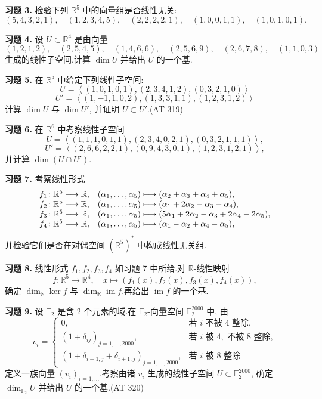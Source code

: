 \noindent\textbf{习题 3.} 检验下列 $\mathbb{R}^5$ 中的向量组是否线性无关:
\[
(5, 4, 3, 2, 1), \quad (1, 2, 3, 4, 5), \quad (2, 2, 2, 2, 1), \quad (1, 0, 0, 1, 1), \quad (1, 0, 1, 0, 1)\text{.}
\]

\noindent\textbf{习题 4.} 设 $U \subset \mathbb{R}^4$ 是由向量
\[
(1, 2, 1, 2), \quad (2, 5, 4, 5), \quad (1, 4, 6, 6), \quad (2, 5, 6, 9), \quad (2, 6, 7, 8), \quad (1, 1, 0, 3)
\]
生成的线性子空间.计算 $\dim U$ 并给出 $U$ 的一个基.

\noindent\textbf{习题 5.} 在 $\mathbb{R}^5$ 中给定下列线性子空间:
\[
U = \left\langle (1, 0, 1, 0, 1), (2, 3, 4, 1, 2), (0, 3, 2, 1, 0) \right\rangle
\]
\[
U' = \left\langle (1, -1, 1, 0, 2), (1, 3, 3, 1, 1), (1, 2, 3, 1, 2) \right\rangle
\]
计算 $\dim U$ 与 $\dim U'$, 并证明 $U \subset U'$.(AT 319)

\noindent\textbf{习题 6.} 在 $\mathbb{R}^6$ 中考察线性子空间
\[
U = \left\langle (1, 1, 1, 0, 1, 1), (2, 3, 4, 0, 2, 1), (0, 3, 2, 1, 1, 1) \right\rangle,
\]
\[
U' = \left\langle (2, 6, 6, 2, 2, 1), (0, 9, 4, 3, 0, 1), (1, 2, 3, 1, 2, 1) \right\rangle,
\]
并计算 $\dim(U \cap U')$.

\noindent\textbf{习题 7.} 考察线性形式
\[
\begin{array}{l l}
f_1 \colon \mathbb{R}^5 \longrightarrow \mathbb{R}, & (\alpha_1, \ldots, \alpha_5) \longmapsto (\alpha_2 + \alpha_3 + \alpha_4 + \alpha_5), \\
f_2 \colon \mathbb{R}^5 \longrightarrow \mathbb{R}, & (\alpha_1, \ldots, \alpha_5) \longmapsto (\alpha_1 + 2\alpha_2 - \alpha_3 - \alpha_4), \\
f_3 \colon \mathbb{R}^5 \longrightarrow \mathbb{R}, & (\alpha_1, \ldots, \alpha_5) \longmapsto (5\alpha_1 + 2\alpha_2 - \alpha_3 + 2\alpha_4 - 2\alpha_5), \\
f_4 \colon \mathbb{R}^5 \longrightarrow \mathbb{R}, & (\alpha_1, \ldots, \alpha_5) \longmapsto (\alpha_1 - \alpha_2 + \alpha_4 - \alpha_5),
\end{array}
\]
并检验它们是否在对偶空间 $(\mathbb{R}^5)^*$ 中构成线性无关组.

\noindent\textbf{习题 8.} 线性形式 $f_1, f_2, f_3, f_4$ 如习题 7 中所给.对 $\mathbb{R}$-线性映射
\[
f \colon \mathbb{R}^5 \longrightarrow \mathbb{R}^4, \quad x \longmapsto \left(f_1(x), f_2(x), f_3(x), f_4(x)\right),
\]
确定 $\dim_\mathbb{R} \ker f$ 与 $\dim_\mathbb{R} \operatorname{im} f$.再给出 $\operatorname{im} f$ 的一个基.

\noindent\textbf{习题 9.} 设 $\mathbb{F}_2$ 是含 2 个元素的域.在 $\mathbb{F}_2$-向量空间 $\mathbb{F}_2^{2000}$ 中, 由
\[
v_i = \begin{cases}
0, & \text{若 } i \text{ 不被 } 4 \text{ 整除}, \\
(1 + \delta_{ij})_{j = 1, \ldots, 2000}, & \text{若 } i \text{ 被 } 4, \text{ 不被 } 8 \text{ 整除}, \\
(1 + \delta_{i - 1, j} + \delta_{i + 1, j})_{j = 1, \ldots, 2000}, & \text{若 } i \text{ 被 } 8 \text{ 整除}
\end{cases}
\]
定义一族向量 $(v_i)_{i = 1, \ldots}$.考察由诸 $v_i$ 生成的线性子空间 $U \subset \mathbb{F}_2^{2000}$, 确定 $\dim_{\mathbb{F}_2} U$ 并给出 $U$ 的一个基.(AT 320)

